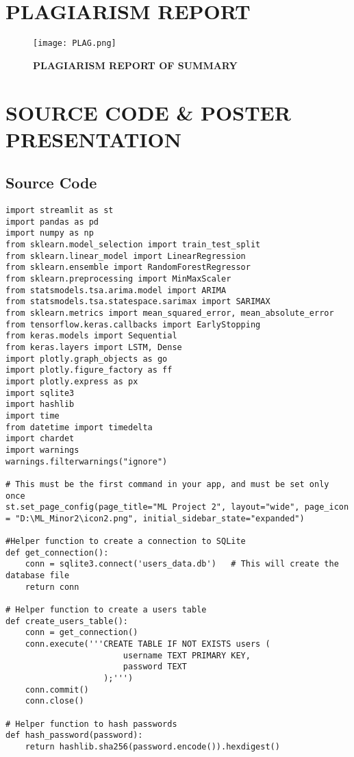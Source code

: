 \documentclass[10pt]{report}
\begin{document}
\begin{center}
\chapter{PLAGIARISM REPORT}
\begin{figure}[H]
 \centering
 \texttt{[image: PLAG.png]}
 \caption{\textbf{PLAGIARISM REPORT OF SUMMARY}}
\end{figure}
\chapter{SOURCE CODE \& POSTER PRESENTATION}
\section{Source Code}
\begin{lstlisting}
import streamlit as st
import pandas as pd
import numpy as np
from sklearn.model_selection import train_test_split
from sklearn.linear_model import LinearRegression
from sklearn.ensemble import RandomForestRegressor
from sklearn.preprocessing import MinMaxScaler
from statsmodels.tsa.arima.model import ARIMA
from statsmodels.tsa.statespace.sarimax import SARIMAX
from sklearn.metrics import mean_squared_error, mean_absolute_error
from tensorflow.keras.callbacks import EarlyStopping
from keras.models import Sequential
from keras.layers import LSTM, Dense
import plotly.graph_objects as go
import plotly.figure_factory as ff
import plotly.express as px
import sqlite3
import hashlib
import time
from datetime import timedelta
import chardet
import warnings
warnings.filterwarnings("ignore")

# This must be the first command in your app, and must be set only once
st.set_page_config(page_title="ML Project 2", layout="wide", page_icon = "D:\ML_Minor2\icon2.png", initial_sidebar_state="expanded")

#Helper function to create a connection to SQLite
def get_connection():
    conn = sqlite3.connect('users_data.db')   # This will create the database file
    return conn

# Helper function to create a users table
def create_users_table():
    conn = get_connection()
    conn.execute('''CREATE TABLE IF NOT EXISTS users (
                        username TEXT PRIMARY KEY,
                        password TEXT
                    );''')
    conn.commit()
    conn.close()

# Helper function to hash passwords
def hash_password(password):
    return hashlib.sha256(password.encode()).hexdigest()   


\end{lstlisting}
\end{center}
\end{document}
